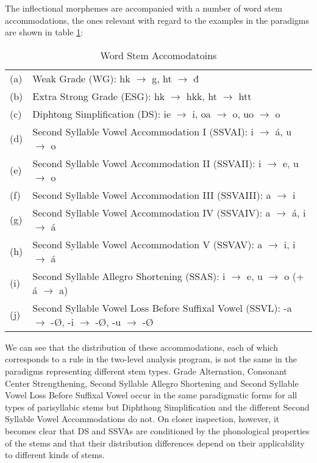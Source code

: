 \documentclass[a4paper,english]{article}
\begin{document}
The inflectional morphemes are accompanied with a number of word stem accommodations,  the ones  relevant with regard to the examples in the paradigms are shown in table \ref{accomodations}:

\begin{table}[htdp]
\caption{Word Stem Accomodatoins}
\begin{center}
\begin{tabular}{ll}
(a) & Weak Grade (WG): hk $\rightarrow$ g, ht $\rightarrow$ đ \\ 
(b) & Extra Strong Grade (ESG): hk $\rightarrow$ hkk, ht $\rightarrow$ htt  \\ 
(c) & Diphtong Simplification (DS): ie $\rightarrow$ i, oa $\rightarrow$ o, uo $\rightarrow$ o \\ 
(d) & Second Syllable Vowel Accommodation I (SSVAI): i $\rightarrow$ á, u $\rightarrow$ o \\ 
(e) & Second Syllable Vowel Accommodation II (SSVAII): i $\rightarrow$ e, u $\rightarrow$ o \\ 
(f) & Second Syllable Vowel Accommodation III (SSVAIII): a $\rightarrow$ i \\ 
(g) & Second Syllable Vowel Accommodation IV (SSVAIV): a $\rightarrow$ á, i $\rightarrow$ á \\ 
(h) & Second Syllable Vowel Accommodation V (SSVAV): a $\rightarrow$ i, i $\rightarrow$ á \\ 
(i) & Second Syllable Allegro Shortening (SSAS): i $\rightarrow$ e, u $\rightarrow$ o (+ á $\rightarrow$ a) \\ 
(j) & Second Syllable Vowel Loss Before Suffixal Vowel (SSVL): -a $\rightarrow$ -Ø, -i $\rightarrow$ -Ø, -u $\rightarrow$ -Ø \\ 
\end{tabular}
\end{center}
\label{accomodations}
\end{table}%

We can see that the distribution of these accommodations, each of which corresponds to a rule in the two-level analysis program, is not the same in the paradigms representing different stem types. Grade Alternation, Consonant Center Strengthening, Second Syllable Allegro Shortening and Second Syllable Vowel Loss Before Suffixal Vowel occur in the same paradigmatic forms for all types of parisyllabic stems but Diphthong Simplification and the different Second Syllable Vowel Accommodations do not. On closer inspection, however, it becomes clear that DS and SSVAs are conditioned by the phonological properties of the stems and that their distribution differences depend on their applicability to different kinds of stems.
\end{document}
